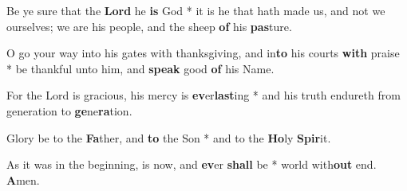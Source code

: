 \begin{multicols}{2}
	Be ye sure that the \textbf{Lord} he \textbf{is} God * it is he that hath made us, and not we ourselves; we are his people, and the sheep \textbf{of} his \textbf{pas}ture.
	
	O go your way into his gates with thanksgiving, and in\textbf{to} his courts \textbf{with} praise * be thankful unto him, and \textbf{speak} good \textbf{of} his Name.
	
	For the Lord is gracious, his mercy is \textbf{ev}er\textbf{last}ing * and his truth endureth from generation to \textbf{ge}ne\textbf{ra}tion.
	
	Glory be to the \textbf{Fa}ther, and \textbf{to} the Son * and to the \textbf{Ho}ly \textbf{Spir}it.
	
	As it was in the beginning, is now, and \textbf{ev}er \textbf{shall} be * world with\textbf{out} end. \textbf{A}men.
\end{multicols}